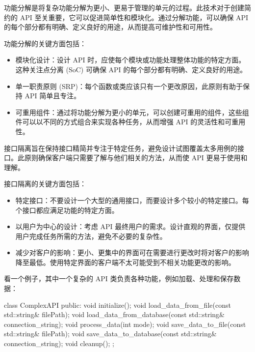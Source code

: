 功能分解是将复杂功能分解为更小、更易于管理的单元的过程。此技术对于创建简约的 API 至关重要，它可以促进简单性和模块化。通过分解功能，可以确保 API 的每个部分都有明确、定义良好的用途，从而提高可维护性和可用性。

功能分解的关键方面包括：

\begin{itemize}
\item
模块化设计：设计 API 时，应使每个模块或功能处理整体功能的特定方面。这种关注点分离 (SoC) 可确保 API 的每个部分都有明确、定义良好的用途。

\item
单一职责原则 (SRP)：每个函数或类应该只有一个更改原因，此原则有助于保持 API 简单且专注。

\item
可重用组件：通过将功能分解为更小的单元，可以创建可重用的组件，这些组件可以以不同的方式组合来实现各种任务，从而增强 API 的灵活性和可重用性。
\end{itemize}

接口隔离旨在保持接口精简并专注于特定任务，避免设计试图覆盖太多用例的接口。此原则确保客户端只需要了解与他们相关的方法，从而使 API 更易于使用和理解。

接口隔离的关键方面包括：

\begin{itemize}
\item
特定接口：不要设计一个大型的通用接口，而要设计多个较小的特定接口。每个接口都应满足功能的特定方面。

\item
以用户为中心的设计：考虑 API 最终用户的需求。设计直观的界面，仅提供用户完成任务所需的方法，避免不必要的复杂性。

\item
减少对客户的影响：更小、更集中的界面可在需要进行更改时将对客户的影响降至最低。使用特定界面的客户端不太可能受到不相关功能更改的影响。
\end{itemize}

看一个例子，其中一个复杂的 API 类负责各种功能，例如加载、处理和保存数据：

\begin{cpp}
class ComplexAPI {
public:
    void initialize();
    void load_data_from_file(const std::string& filePath);
    void load_data_from_database(const std::string& connection_string);
    void process_data(int mode);
    void save_data_to_file(const std::string& filePath);
    void save_data_to_database(const std::string& connection_string);
    void cleanup();
};
\end{cpp}

